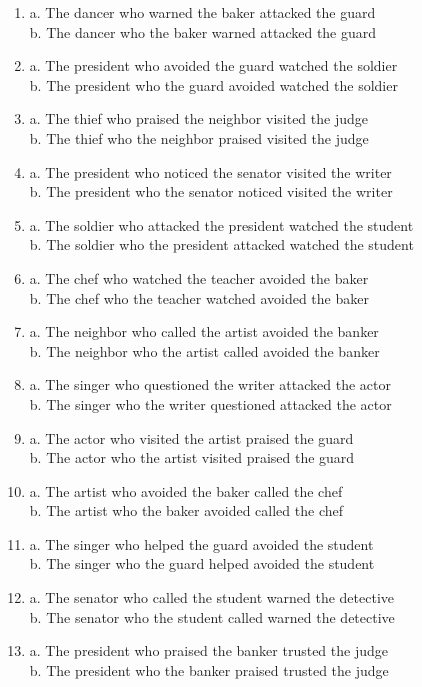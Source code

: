\documentclass[11pt]{article}
\begin{document}
\begin{enumerate}[label={(\arabic*)}, nosep]
  \item a. The dancer who warned the baker attacked the guard \\ b. The dancer who the baker warned attacked the guard
  \item a. The president who avoided the guard watched the soldier \\ b. The president who the guard avoided watched the soldier
  \item a. The thief who praised the neighbor visited the judge \\ b. The thief who the neighbor praised visited the judge
  \item a. The president who noticed the senator visited the writer \\ b. The president who the senator noticed visited the writer
  \item a. The soldier who attacked the president watched the student \\ b. The soldier who the president attacked watched the student
  \item a. The chef who watched the teacher avoided the baker \\ b. The chef who the teacher watched avoided the baker
  \item a. The neighbor who called the artist avoided the banker \\ b. The neighbor who the artist called avoided the banker
  \item a. The singer who questioned the writer attacked the actor \\ b. The singer who the writer questioned attacked the actor
  \item a. The actor who visited the artist praised the guard \\ b. The actor who the artist visited praised the guard
  \item a. The artist who avoided the baker called the chef \\ b. The artist who the baker avoided called the chef
  \item a. The singer who helped the guard avoided the student \\ b. The singer who the guard helped avoided the student
  \item a. The senator who called the student warned the detective \\ b. The senator who the student called warned the detective
  \item a. The president who praised the banker trusted the judge \\ b. The president who the banker praised trusted the judge

\end{enumerate}
\end{document}
